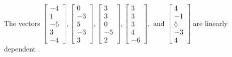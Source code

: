 \begin{exercise}
\begin{exerciseStatement}
  \end{exerciseStatement}
  \begin{exerciseAnswer}
   The vectors \(\left[\begin{array}{r}
-4 \\
1 \\
-6 \\
3 \\
-4
\end{array}\right] , \left[\begin{array}{r}
0 \\
-3 \\
5 \\
-3 \\
3
\end{array}\right] , \left[\begin{array}{r}
3 \\
3 \\
0 \\
-5 \\
2
\end{array}\right] , \left[\begin{array}{r}
3 \\
3 \\
3 \\
4 \\
-6
\end{array}\right] , \text{ and } \left[\begin{array}{r}
4 \\
-1 \\
6 \\
-3 \\
4
\end{array}\right]\) are 
  	 linearly dependent  .
  


  \end{exerciseAnswer}
\end{exercise}